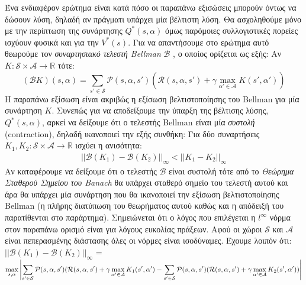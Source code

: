\documentclass[11pt]{article} %
\numberwithin{equation}{subsection}
\begin{document}
Ένα ενδιαφέρον ερώτημα είναι κατά πόσο οι παραπάνω εξισώσεις μπορούν όντως να δώσουν λύση, δηλαδή αν πράγματι υπάρχει μία βέλτιστη λύση. Θα ασχοληθούμε μόνο με την περίπτωση της συνάρτησης $Q^*(s, \alpha)$ όμως παρόμοιες συλλογιστικές πορείες ισχύουν φυσικά και για την $V^*(s)$. Για να απαντήσουμε στο ερώτημα αυτό θεωρούμε τον \textit{συναρτησιακό τελεστή Bellman} $\mathcal{B}$ \cite{valuefun}, ο οποίος ορίζεται ως εξής: Αν $K: \mathcal{S} \times \mathcal{A} \rightarrow \mathbb{R}$ τότε:
\begin{equation}
\displaystyle (\mathcal{B} K)(s, \alpha) = \sum_{s' \in \mathcal{S}} \mathcal{P}(s, \alpha, s') \left(\mathcal{R}(s, \alpha, s') + \gamma \max_{\alpha ' \in \mathcal{A}} K(s', \alpha ') \right)
\end{equation} 
Η παραπάνω εξίσωση είναι ακριβώς η εξίσωση βελτιστοποίησης του Bellman για μία συνάρτηση $K$. Συνεπώς για να αποδείξουμε την ύπαρξη της βέλτισης λύσης, $Q^*(s,\alpha)$, αρκεί να δείξουμε ότι ο τελεστής Bellman είναι μία \textit{συστολή} (contraction), δηλαδή ικανοποιεί την εξής συνθήκη: Για δύο συναρτήσεις $K_1,K_2 : \mathcal{S} \times \mathcal{A} \rightarrow \mathbb{R}$ ισχύει η ανισότητα:
\begin{align}
||\mathcal{B}(K_1) - \mathcal{B}(K_2)||_{\infty} < ||K_1 - K_2||_{\infty}
\end{align}
Αν καταφέρουμε να δείξουμε ότι ο τελεστής $\mathcal{B}$ είναι συστολή τότε από το \textit{Θεώρημα Σταθερού Σημείου του Banach} θα υπάρχει σταθερό σημείο του τελεστή αυτού και άρα θα υπάρχει μία συνάρτηση που θα ικανοποιεί την εξίσωση βελτιστοποίησης Bellman (η πλήρης διατύπωση του θεωρήματος αυτού καθώς και η απόδειξή του παρατίθενται στο παράρτημα). Σημειώνεται ότι ο λόγος που επιλέγεται η $l ^ {\infty}$ νόρμα στον παραπάνω ορισμό είναι για λόγους ευκολίας πράξεων. Αφού οι χώροι $\mathcal{S}$ και $\mathcal{A}$ είναι πεπερασμένης διάστασης όλες οι νόρμες είναι ισοδύναμες. Έχουμε λοιπόν ότι:\\

$\displaystyle ||\mathcal{B}(K_1) - \mathcal{B}(K_2)||_{\infty}$ =\\ 

$\displaystyle \max_{s, \alpha}  \abs{ \sum_{s' \in \mathcal{S}} \mathcal{P}(s, \alpha, s') (\mathcal{R}(s, \alpha, s') + \gamma \max_{\alpha ' \in \mathcal{A}} K_1 (s', \alpha ') \\
\displaystyle -\sum_{s' \in \mathcal{S}} \mathcal{P}(s, \alpha, s') (\mathcal{R}(s, \alpha, s') + \gamma \max_{\alpha ' \in \mathcal{A}} K_2 (s', \alpha '))} $\\
\end{document}
